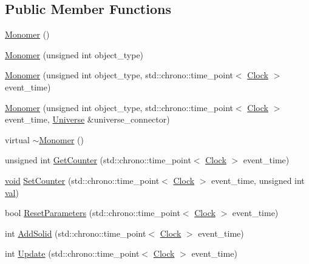 \subsection*{Public Member Functions}
\begin{DoxyCompactItemize}
\item 
\mbox{\hyperlink{class_monomer_a2b1f69caca47d8597e43300ae7076095}{Monomer}} ()
\item 
\mbox{\hyperlink{class_monomer_af2249bf76132ee3802eaccb49b76fb96}{Monomer}} (unsigned int object\+\_\+type)
\item 
\mbox{\hyperlink{class_monomer_acab23e1c41e236417492da5c1e617b1a}{Monomer}} (unsigned int object\+\_\+type, std\+::chrono\+::time\+\_\+point$<$ \mbox{\hyperlink{universe_8h_a0ef8d951d1ca5ab3cfaf7ab4c7a6fd80}{Clock}} $>$ event\+\_\+time)
\item 
\mbox{\hyperlink{class_monomer_ae2b80466a0e724125aee173df34d1a6c}{Monomer}} (unsigned int object\+\_\+type, std\+::chrono\+::time\+\_\+point$<$ \mbox{\hyperlink{universe_8h_a0ef8d951d1ca5ab3cfaf7ab4c7a6fd80}{Clock}} $>$ event\+\_\+time, \mbox{\hyperlink{class_universe}{Universe}} \&universe\+\_\+connector)
\item 
virtual \mbox{\hyperlink{class_monomer_a802bf239fc55d16783736393edbd6899}{$\sim$\+Monomer}} ()
\item 
unsigned int \mbox{\hyperlink{class_monomer_a4651a4bd0a41d0698821421043e41126}{Get\+Counter}} (std\+::chrono\+::time\+\_\+point$<$ \mbox{\hyperlink{universe_8h_a0ef8d951d1ca5ab3cfaf7ab4c7a6fd80}{Clock}} $>$ event\+\_\+time)
\item 
\mbox{\hyperlink{glad_8h_a950fc91edb4504f62f1c577bf4727c29}{void}} \mbox{\hyperlink{class_monomer_a6f0dfa4382b3d4fa19b7ee0fb8fe7a55}{Set\+Counter}} (std\+::chrono\+::time\+\_\+point$<$ \mbox{\hyperlink{universe_8h_a0ef8d951d1ca5ab3cfaf7ab4c7a6fd80}{Clock}} $>$ event\+\_\+time, unsigned int \mbox{\hyperlink{glad_8h_a26942fd2ed566ef553eae82d2c109c8f}{val}})
\item 
bool \mbox{\hyperlink{class_monomer_a16a692cf11117581c9b4ebbed3c04c9c}{Reset\+Parameters}} (std\+::chrono\+::time\+\_\+point$<$ \mbox{\hyperlink{universe_8h_a0ef8d951d1ca5ab3cfaf7ab4c7a6fd80}{Clock}} $>$ event\+\_\+time)
\item 
int \mbox{\hyperlink{class_monomer_ac03023c0d1bb67e5f11091af7ad3735d}{Add\+Solid}} (std\+::chrono\+::time\+\_\+point$<$ \mbox{\hyperlink{universe_8h_a0ef8d951d1ca5ab3cfaf7ab4c7a6fd80}{Clock}} $>$ event\+\_\+time)
\item 
int \mbox{\hyperlink{class_monomer_a48dc2ffb5da8cf3dc3f4f56bba674de6}{Update}} (std\+::chrono\+::time\+\_\+point$<$ \mbox{\hyperlink{universe_8h_a0ef8d951d1ca5ab3cfaf7ab4c7a6fd80}{Clock}} $>$ event\+\_\+time)

\end{DoxyCompactItemize}
